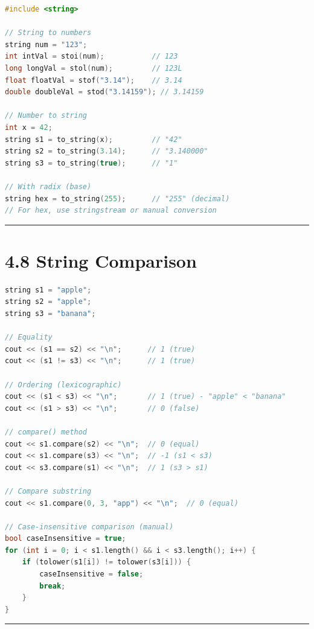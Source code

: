 \begin{lstlisting}[language={C++}]
#include <string>

// String to numbers
string num = "123";
int intVal = stoi(num);           // 123
long longVal = stol(num);         // 123L
float floatVal = stof("3.14");    // 3.14
double doubleVal = stod("3.14159"); // 3.14159

// Number to string
int x = 42;
string s1 = to_string(x);         // "42"
string s2 = to_string(3.14);      // "3.140000"
string s3 = to_string(true);      // "1"

// With radix (base)
string hex = to_string(255);      // "255" (decimal)
// For hex, use stringstream or manual conversion
\end{lstlisting}

\begin{center}\rule{0.5\linewidth}{0.5pt}\end{center}

\hypertarget{string-comparison}{%
\section{4.8 String Comparison}\label{string-comparison}}

\begin{lstlisting}[language={C++}]
string s1 = "apple";
string s2 = "apple";
string s3 = "banana";

// Equality
cout << (s1 == s2) << "\n";      // 1 (true)
cout << (s1 != s3) << "\n";      // 1 (true)

// Ordering (lexicographic)
cout << (s1 < s3) << "\n";       // 1 (true) - "apple" < "banana"
cout << (s1 > s3) << "\n";       // 0 (false)

// compare() method
cout << s1.compare(s2) << "\n";  // 0 (equal)
cout << s1.compare(s3) << "\n";  // -1 (s1 < s3)
cout << s3.compare(s1) << "\n";  // 1 (s3 > s1)

// Compare substring
cout << s1.compare(0, 3, "app") << "\n";  // 0 (equal)

// Case-insensitive comparison (manual)
bool caseInsensitive = true;
for (int i = 0; i < s1.length() && i < s3.length(); i++) {
    if (tolower(s1[i]) != tolower(s3[i])) {
        caseInsensitive = false;
        break;
    }
}
\end{lstlisting}

\begin{center}\rule{0.5\linewidth}{0.5pt}\end{center}

